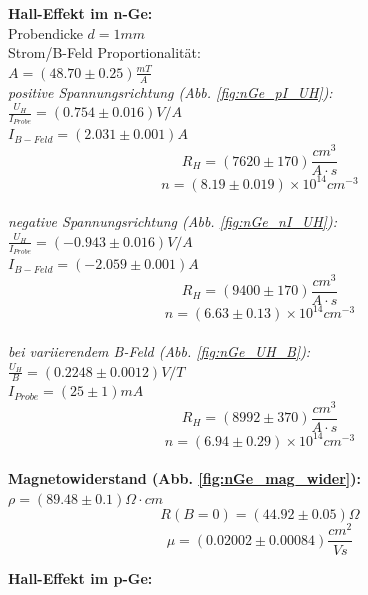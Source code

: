 \documentclass[12pt,a4paper]{article}
\begin{document}
\begin{multicols}{2}

\noindent \textbf{Hall-Effekt im n-Ge:}\\
Probendicke $d=1mm$\\
Strom/B-Feld Proportionalität:\\
$A=(48.70 \pm 0.25)\frac{mT}{A}$\\

\noindent \emph{positive Spannungsrichtung (Abb. \ref{fig:nGe_pI_UH}):}\\

\noindent$\frac{U_H}{I_{Probe}}=(0.754\pm 0.016)V/A$\\
$I_{B-Feld}=(2.031 \pm 0.001)A$\\
$$R_H=(7620 \pm 170)\frac{cm^3}{A\cdot s}$$
$$n=(8.19\pm 0.019)\times 10^{14}cm^{-3}$$\\


\noindent \emph{negative Spannungsrichtung (Abb. \ref{fig:nGe_nI_UH}):}\\

\noindent$\frac{U_H}{I_{Probe}}=(-0.943\pm 0.016)V/A$\\
$I_{B-Feld}=(-2.059 \pm 0.001)A$\\
$$R_H=(9400 \pm 170)\frac{cm^3}{A\cdot s}$$
$$n=(6.63\pm 0.13)\times 10^{14}cm^{-3}$$\\


\noindent \emph{bei variierendem B-Feld (Abb. \ref{fig:nGe_UH_B}):}\\

\noindent$\frac{U_H}{B}=(0.2248\pm 0.0012)V/T$\\
$I_{Probe}=(25 \pm 1)mA$\\
$$R_H=(8992 \pm 370)\frac{cm^3}{A\cdot s}$$
$$n=(6.94\pm 0.29)\times 10^{14}cm^{-3}$$\\


\noindent \textbf{Magnetowiderstand (Abb. \ref{fig:nGe_mag_wider}):}\\
$\rho=(89.48\pm 0.1)\Omega \cdot cm$
$$R(B=0)=(44.92 \pm 0.05) \Omega$$
$$\mu=(0.02002 \pm 0.00084)\frac{cm^2}{Vs}$$



\pagebreak
\end{multicols}
\noindent \textbf{Hall-Effekt im p-Ge:}\\


\end{document}
